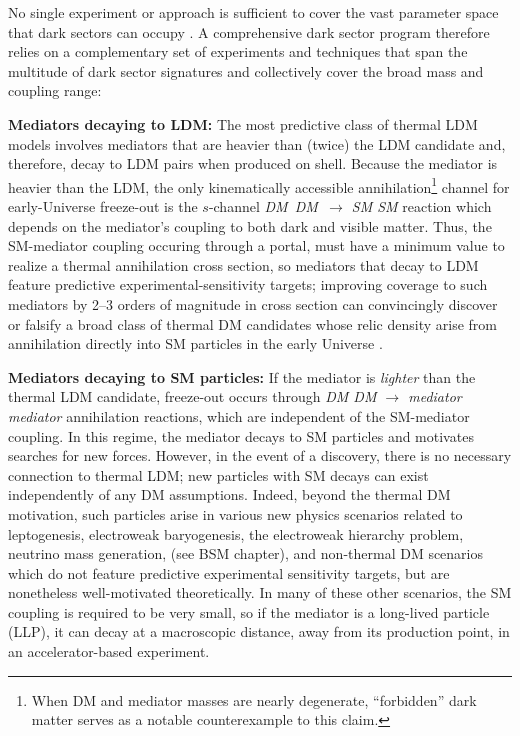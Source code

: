 \documentclass[../report.tex]{subfiles}
\begin{document}
No single experiment or approach is sufficient to cover the vast parameter space that dark sectors 
can occupy \cite{Izaguirre:2015yja,Battaglieri:2017aum}. A comprehensive dark sector program therefore relies on a complementary set of experiments and techniques that span the multitude of dark sector signatures and collectively cover the broad mass and coupling range:

\vspace{- 1mm}
{\bf Mediators decaying to LDM:} The most predictive class of thermal LDM models involves mediators that are heavier than  (twice) the LDM candidate and, therefore, decay to LDM pairs when produced on shell. Because the mediator is heavier than the LDM, the only kinematically accessible annihilation\footnote{When DM and mediator masses
are nearly degenerate, ``forbidden'' dark matter \cite{DAgnolo:2015ujb} 
serves as a notable counterexample to this claim.} channel for  early-Universe freeze-out is the $s$-channel {\it DM~DM~$\rightarrow$ SM SM} reaction which depends on the mediator's coupling to both dark and visible matter. 
Thus, the SM-mediator coupling occuring through a portal,  must have a minimum value to realize a thermal annihilation cross section, so mediators that decay to LDM feature predictive experimental-sensitivity targets; improving coverage to such mediators by 2--3 orders of magnitude in cross section can convincingly discover or falsify a broad class of thermal DM candidates whose relic density arise from annihilation directly into SM particles in the early Universe \cite{Battaglieri:2017aum,Izaguirre:2015yja}. 

\vspace{- 1mm}
{\bf Mediators decaying to SM particles:} If the mediator is {\it lighter} than the thermal LDM candidate, freeze-out occurs through {\it DM DM $\rightarrow$ mediator mediator} annihilation reactions, 
which are independent of the SM-mediator coupling. In this regime, the mediator decays  to SM particles and motivates searches for new forces. However, in the event of a discovery, there is no necessary connection to thermal LDM; new particles with SM decays can exist independently of any DM assumptions. Indeed, beyond the thermal DM motivation, such particles arise in various new physics scenarios related to  leptogenesis, electroweak baryogenesis, %
the electroweak hierarchy problem, neutrino mass generation,
(see BSM chapter), and non-thermal DM scenarios which do not feature predictive experimental sensitivity targets, but are nonetheless well-motivated theoretically.
In many of these other scenarios, the SM coupling is required to be very small, so if the mediator is a long-lived particle (LLP), it can decay at a macroscopic distance, away from its production point, in an accelerator-based experiment.  
\end{document}
